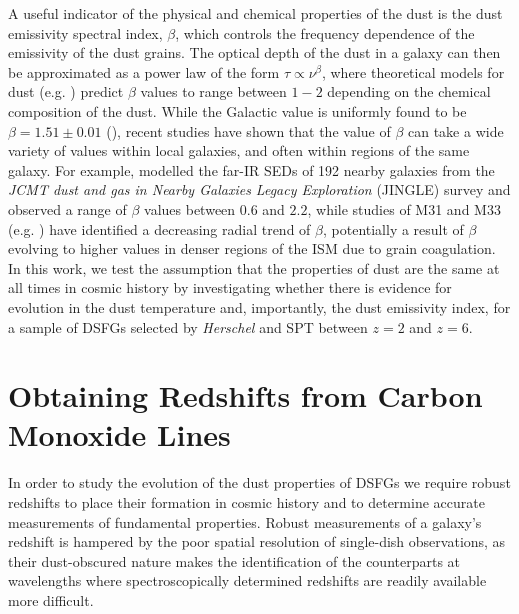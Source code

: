 A useful indicator of the physical and chemical properties of the dust is the dust emissivity spectral index, $\beta$, which controls the frequency dependence of the emissivity of the dust grains. The optical depth of the dust in a galaxy can then be approximated as a power law of the form $\tau \propto \nu^\beta$, where theoretical models for dust (e.g. \citealt{Draine_1984, Draine_2011, Kohler_2015}) predict $\beta$ values to range between $1 - 2$ depending on the chemical composition of the dust. While the Galactic value is uniformly found to be $\beta = 1.51\pm0.01$ (\citealt{Planck_Collaboration_2015}), recent studies have shown that the value of $\beta$ can take a wide variety of values within local galaxies, and often within regions of the same galaxy. For example, \citealt{Lamperti_2019} modelled the far-IR SEDs of 192 nearby galaxies from the \textit{JCMT dust and gas in Nearby Galaxies Legacy Exploration} (JINGLE) survey and observed a range of $\beta$ values between $0.6$ and $2.2$, while studies of M31 and M33 (e.g. \citealt{Smith_2012, Draine_2014, Tabatabaei_2014, Whitworth_2019, Athikkat-Eknath_2022, Clark_2023}) have identified a decreasing radial trend of $\beta$, potentially a result of $\beta$ evolving to higher values in denser regions of the ISM due to grain coagulation. In this work, we test the assumption that the properties of dust are the same at all times in cosmic history by investigating whether there is evidence for evolution in the dust temperature and, importantly, the dust emissivity index, for a sample of DSFGs selected by \textit{Herschel} and SPT between $z = 2$ and $z = 6$.

\section{Obtaining Redshifts from Carbon Monoxide Lines}

In order to study the evolution of the dust properties of DSFGs we require robust redshifts to place their formation in cosmic history and to determine accurate measurements of fundamental properties. Robust measurements of a galaxy's redshift is hampered by the poor spatial resolution of single-dish observations, as their dust-obscured nature makes the identification of the counterparts at wavelengths where spectroscopically determined redshifts are readily available more difficult.

